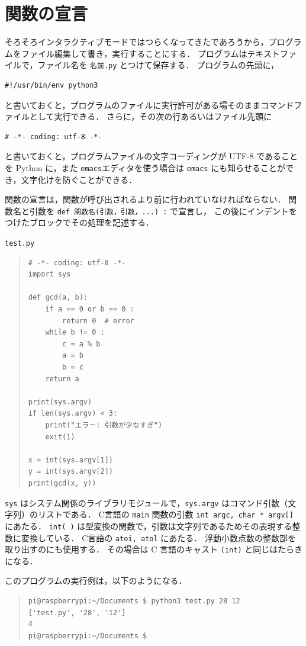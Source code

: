 \documentclass[11pt,a4,epsf]{report}
\begin{document}
\section{関数の宣言}

そろそろインタラクティブモードではつらくなってきたであろうから，プログラムをファイル編集して書き，実行することにする．
プログラムはテキストファイルで，ファイル名を \verb+名前.py+ とつけて保存する．
プログラムの先頭に，
\begin{verbatim}
#!/usr/bin/env python3
\end{verbatim}
と書いておくと，プログラムのファイルに実行許可がある場そのままコマンドファイルとして実行できる．
さらに，その次の行あるいはファイル先頭に
\begin{verbatim}
# -*- coding: utf-8 -*-
\end{verbatim}
と書いておくと，プログラムファイルの文字コーディングが UTF-8 であることを Python に，また \verb+emacs+エディタを使う場合は \verb+emacs+ にも知らせることができ，文字化けを防ぐことができる．

関数の宣言は，関数が呼び出されるより前に行われていなければならない．
関数名と引数を \verb+def 関数名(引数，引数，...) :+ で宣言し，
この後にインデントをつけたブロックでその処理を記述する．
\begin{itembox}[l]{\tt test.py}
\begin{quote}
\small
\begin{verbatim}
# -*- coding: utf-8 -*-
import sys

def gcd(a, b):
    if a == 0 or b == 0 :
        return 0  # error
    while b != 0 :
        c = a % b
        a = b
        b = c
    return a

print(sys.argv)
if len(sys.argv) < 3:
    print("エラー: 引数が少なすぎ")
    exit(1) 

x = int(sys.argv[1])
y = int(sys.argv[2])
print(gcd(x, y))
\end{verbatim}
\end{quote}
\end{itembox}
\verb+sys+ はシステム関係のライブラリモジュールで，\verb+sys.argv+ はコマンド引数（文字列）のリストである．
C言語の \verb+main+ 関数の引数 \verb+int argc, char * argv[]+ にあたる．
\verb+int( )+ は型変換の関数で，引数は文字列であるためその表現する整数に変換している．
C言語の \verb+atoi, atol+ にあたる．
浮動小数点数の整数部を取り出すのにも使用する．
その場合は C 言語のキャスト \verb+(int)+ と同じはたらきになる．

このプログラムの実行例は，以下のようになる．
\begin{quote}
\small
\begin{verbatim}
pi@raspberrypi:~/Documents $ python3 test.py 28 12
['test.py', '28', '12']
4
pi@raspberrypi:~/Documents $
\end{verbatim}
\end{quote}
\end{document}
